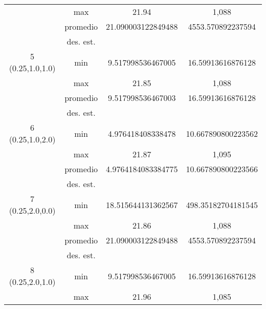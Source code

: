 \documentclass{report}
\begin{document}
\begin{table}[H]
\begin{tabular}{|c|c|c|c|}
                              & max                         &     21.94       &   1,088     \\ \cline{2-4} 
                              & promedio                    &     21.090003122849488       &   4553.570892237594     \\ \cline{2-4} 
                              & des. est.                   &            &        \\ \hline
        5 (0.25,1.0,1.0)                    & min                         &    9.517998536467005        &   16.59913616876128     \\ \cline{2-4} 
                              & max                         &        21.85    &    1,088    \\ \cline{2-4} 
                              & promedio                    &      9.517998536467003      &     16.59913616876128   \\ \cline{2-4} 
                              & des. est.                   &            &        \\ \hline
        6 (0.25,1.0,2.0)                    & min                         &    4.976418408338478        &    10.667890800223562    \\ \cline{2-4} 
                              & max                         &        21.87    &     1,095   \\ \cline{2-4} 
                              & promedio                    &     4.9764184083384775       &   10.667890800223566     \\ \cline{2-4} 
                              & des. est.                   &            &        \\ \hline
        7 (0.25,2.0,0.0)                    & min                         &    18.515644131362567        &   498.35182704181545     \\ \cline{2-4} 
                              & max                         &        21.86    &     1,088   \\ \cline{2-4} 
                              & promedio                    &      21.090003122849488      &   4553.570892237594     \\ \cline{2-4} 
                              & des. est.                   &            &        \\ \hline
        8 (0.25,2.0,1.0)                    & min                         &      9.517998536467005      &    16.59913616876128    \\ \cline{2-4} 
                              & max                         &     21.96       &    1,085    \\ \cline{2-4} 

\end{tabular}
\end{table}
\end{document}
